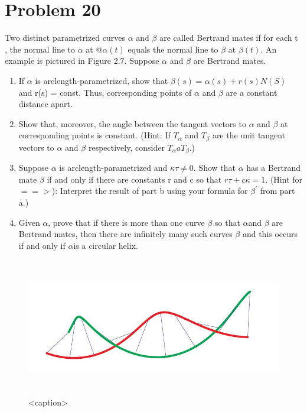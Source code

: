 \documentclass[
	12pt, %
]{fphw}
\theoremstyle{plain}
\begin{document}
\section*{Problem 20}
\begin{problem}
     Two distinct parametrized curves $\alpha$ and $\beta$ are called Bertrand mates if for each t , the normal line to $\alpha$
     at $@\alpha(t)$  equals the normal line to $\beta$ at $\beta(t)$. An example is pictured in Figure 2.7. Suppose $\alpha$ and $\beta$ are Bertrand mates.
     \begin{enumerate} %
          \item If $\alpha$ is arclength-parametrized, show that $\beta(s)  = \alpha(s) + r(s)N(S)$ and r(s) = const. Thus,
          corresponding points of $\alpha$ and $\beta$ are a constant distance apart. 
          \item Show that, moreover, the angle between the tangent vectors to $\alpha$ and $\beta$ at corresponding points
          is constant. (Hint: If $T_{\alpha}$ and $T_{\beta}$ are the unit tangent vectors to $\alpha$ and $\beta$ respectively, consider
          $T_{\alpha}aT_{\beta}$.)
          \item Suppose $\alpha$ is arclength-parametrized and $\kappa\tau \neq 0$. Show that $\alpha$ has a Bertrand mate $\beta$ if and only if
          there are constants r and c so that $r\tau + c\kappa = 1$. (Hint for $==>$): Interpret the result of part b using
          your formula for $\beta^{'}$ from part a.)
          \item Given $\alpha$, prove that if there is more than one curve $\beta$ so that $\alpha$and $\beta$ are Bertrand mates, then there
          are infinitely many such curves $\beta$ and this occurs if and only if $\alpha$is a circular helix.
     \end{enumerate}
\end{problem}
\begin{figure}[htbp]
     \centering
     \includegraphics[width=\linewidth, width=14cm, height=6cm]{question_20.jpg}
     \caption{<caption>}
     \label{<label>}
\end{figure}
\end{document}
